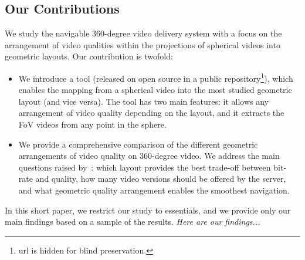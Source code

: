 \subsection{Our Contributions}

%
We study the navigable 360-degree video delivery system with a 
focus on the arrangement of video qualities within the projections of 
spherical videos into geometric layouts. Our contribution is twofold:
\begin{itemize}
\item We introduce a tool (released on open source in a public 
repository\footnote{url is hidden for blind
preservation.}), which enables the mapping from a spherical video
into the most studied  geometric layout (and vice versa). The tool has two main 
features: it allows
any arrangement of video quality depending on the layout, and it 
extracts the 
\ac{FoV} videos from any point in the sphere. 
\item We provide a comprehensive comparison of the different geometric arrangements of
video quality on 360-degree video. We address the main questions raised 
by~\citet{facebook}: which layout provides the best trade-off 
between bit-rate and
quality, how many video versions should be offered by the server, and what geometric 
quality arrangement 
enables the smoothest navigation.
\end{itemize}

In this short paper, we restrict our study to essentials, and we provide only our main findings based on a 
sample of the results. \textit{Here are our findings...}




